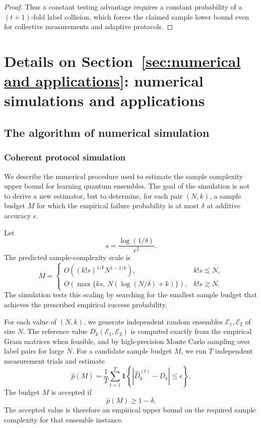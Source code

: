 \documentclass[aps,prx,reprint,superscriptaddress,amsmath,amssymb,longbibliography,floatfix]{revtex4-2}
\theoremstyle{plain}
\theoremstyle{definition}
\theoremstyle{remark}
\begin{document}
\begin{proof}
Thus a constant testing advantage requires a constant probability of a $(t+1)$-fold label collision, which forces the claimed sample lower bound even for collective measurements and adaptive protocols.
\end{proof}

\section{Details on Section~\ref{sec:numerical and applications}: numerical simulations and applications}
\label{app:numerical details}

\subsection{The algorithm of numerical simulation}\label{app: algorithms}


\subsubsection{Coherent protocol simulation}
\label{app:algorithm-simulation}

We describe the numerical procedure used to estimate the sample complexity upper
bound for learning quantum ensembles.  The goal of the simulation is not to
derive a new estimator, but to determine, for each pair $(N,k)$, a sample budget
$M$ for which the empirical failure probability is at most $\delta$ at additive
accuracy $\epsilon$.

Let
\begin{equation}
    s = \frac{\log(1/\delta)}{\epsilon^2}.
\end{equation}
The predicted sample-complexity scale is
\begin{equation}
    M =
    \begin{cases}
    O\!\left((k!s)^{1/k}N^{1-1/k}\right),
    & k!s \lesssim N, \\[4pt]
    O\!\left(\max\{ks,\,N(\log(N/\delta)+k)\}\right),
    & k!s \gtrsim N .
    \end{cases}
\end{equation}
The simulation tests this scaling by searching for the smallest sample budget
that achieves the prescribed empirical success probability.

For each value of $(N,k)$, we generate independent random ensembles
$\mathcal E_1,\mathcal E_2$ of size $N$.  The reference value
$D_k(\mathcal E_1,\mathcal E_2)$ is computed exactly from the empirical Gram
matrices when feasible, and by high-precision Monte Carlo sampling over label
pairs for large $N$.  For a candidate sample budget $M$, we run $T$ independent
measurement trials and estimate
\begin{equation}
    \widehat p(M)
    =
    \frac{1}{T}
    \sum_{t=1}^T
    \mathbf 1
    \left\{
        \left|\widehat D_k^{(t)} - D_k\right|
        \leq \epsilon
    \right\}.
\end{equation}
The budget $M$ is accepted if
\begin{equation}
    \widehat p(M) \geq 1-\delta .
\end{equation}
The accepted value is therefore an empirical upper bound on the required sample
complexity for that ensemble instance.
\end{document}
